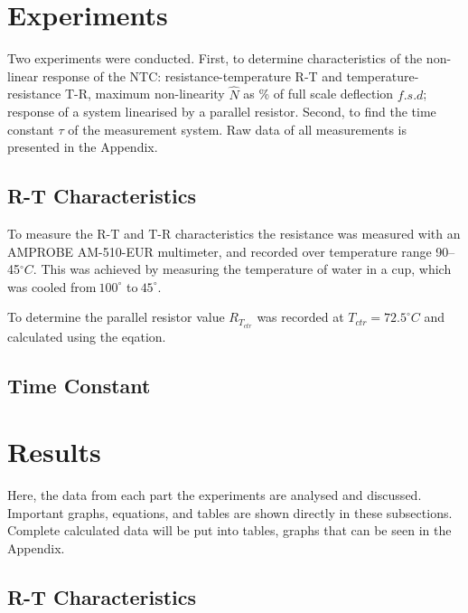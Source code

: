 \documentclass[a4,11pt]{article}
\begin{document}
\section{Experiments}
Two experiments were conducted. First, to determine characteristics of the non-linear response of the NTC: resistance-temperature R-T and temperature-resistance T-R, maximum non-linearity $\hat N$ as \% of full scale deflection $f.s.d$; response of a system linearised by a parallel resistor. Second, to find the time constant $\tau$ of the measurement system. Raw data of all measurements is presented in the Appendix.
\subsection{R-T Characteristics}

To measure the R-T and T-R characteristics the resistance was measured with an AMPROBE AM-510-EUR multimeter, and recorded over temperature range 90--45$^{\circ}C$. This was achieved by measuring the temperature of water in a cup, which was cooled from$~100^{\circ}$ to$~45^{\circ}$.

To determine the parallel resistor value $R_{T_{ctr}}$ was recorded at $T_{ctr}=72.5^{\circ}C$ and calculated using the eqation.
\subsection{Time Constant}
\section{Results}
Here, the data from each part the experiments are analysed and discussed. Important graphs, equations, and tables are shown directly in these subsections. Complete calculated data will be put into tables, graphs that can be seen in the Appendix.
\subsection{R-T Characteristics}
\end{document}
